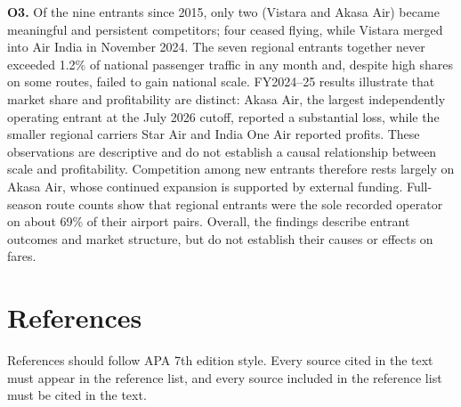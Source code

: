 \documentclass[12pt,a4paper]{article}
\newenvironment{o3box}{\ifthenelse{\boolean{o3highlight}}{\begingroup\color{o3sky}}{}}{\ifthenelse{\boolean{o3highlight}}{\endgroup}{}}
\begin{document}
\begin{o3box}

\textbf{O3.} Of the nine entrants since 2015, only two (Vistara and Akasa Air) became meaningful and persistent competitors; four ceased flying, while Vistara merged into Air India in November 2024. The seven regional entrants together never exceeded 1.2\% of national passenger traffic in any month and, despite high shares on some routes, failed to gain national scale. FY2024--25 results illustrate that market share and profitability are distinct: Akasa Air, the largest independently operating entrant at the July 2026 cutoff, reported a substantial loss, while the smaller regional carriers Star Air and India One Air reported profits. These observations are descriptive and do not establish a causal relationship between scale and profitability. Competition among new entrants therefore rests largely on Akasa Air, whose continued expansion is supported by external funding. Full-season route counts show that regional entrants were the sole recorded operator on about 69\% of their airport pairs. Overall, the findings describe entrant outcomes and market structure, but do not establish their causes or effects on fares.

\end{o3box}

\newpage

\section*{References}
References should follow APA 7th edition style. Every source cited in the text must appear in the reference list, and every source included in the reference list must be cited in the text.
\end{document}
